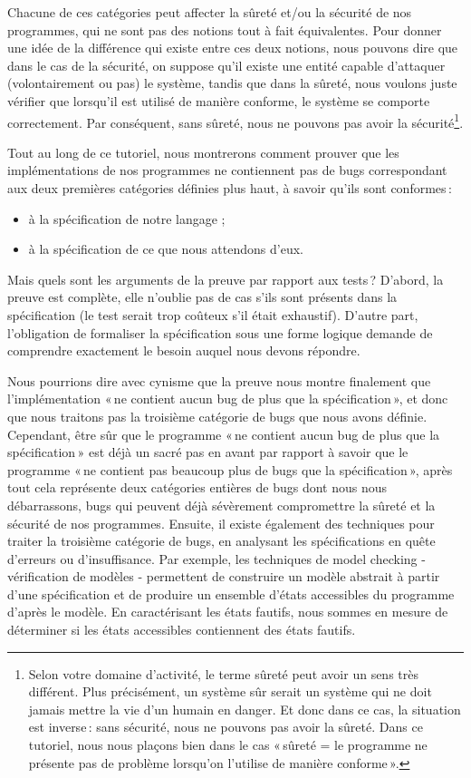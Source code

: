 Chacune de ces catégories peut affecter la sûreté et/ou la sécurité de nos
programmes, qui ne sont pas des notions tout à fait équivalentes. Pour donner
une idée de la différence qui existe entre ces deux notions, nous pouvons
dire que dans le cas de la sécurité, on suppose qu’il existe une entité
capable d’attaquer (volontairement ou pas) le système, tandis que dans la
sûreté, nous voulons juste vérifier que lorsqu’il est utilisé de manière
conforme, le système se comporte correctement. Par conséquent, sans sûreté,
nous ne pouvons pas avoir la sécurité\footnote{Selon votre domaine
d’activité, le terme sûreté peut avoir un sens très différent. Plus
précisément, un système sûr serait un système qui ne doit jamais mettre la
vie d’un humain en danger. Et donc dans ce cas, la situation est inverse :
sans sécurité, nous ne pouvons pas avoir la sûreté. Dans ce tutoriel, nous
nous plaçons bien dans le cas « sûreté = le programme ne présente pas de
problème lorsqu’on l’utilise de manière conforme ».}.


Tout au long de ce tutoriel, nous montrerons comment prouver que les
implémentations de nos programmes ne contiennent pas de bugs correspondant
aux deux premières catégories définies plus haut, à savoir qu’ils sont
conformes :


\begin{itemize}
\item à la spécification de notre langage ;
\item à la spécification de ce que nous attendons d’eux.
\end{itemize}


Mais quels sont les arguments de la preuve par rapport aux tests ? D’abord,
la preuve est complète, elle n’oublie pas de cas s’ils sont présents dans la
spécification (le test serait trop coûteux s’il était exhaustif). D’autre
part, l’obligation de formaliser la spécification sous une forme logique
demande de comprendre exactement le besoin auquel nous devons répondre.

Nous pourrions dire avec cynisme que la preuve nous montre finalement que
l’implémentation « ne contient aucun bug de plus que la spécification », et
donc que nous traitons pas la troisième catégorie de bugs que nous avons
définie. Cependant, être sûr que le programme « ne contient aucun bug de
plus que la spécification » est déjà un sacré pas en avant par rapport à
savoir que le programme « ne contient pas beaucoup plus de bugs que la
spécification », après tout cela représente deux catégories entières de bugs
dont nous nous débarrassons, bugs qui peuvent déjà sévèrement compromettre la
sûreté et la sécurité de nos programmes. Ensuite, il existe également des
techniques pour traiter la troisième catégorie de bugs, en analysant les
spécifications en quête d’erreurs ou d’insuffisance. Par exemple, les
techniques de model checking - vérification de modèles - permettent de
construire un modèle abstrait à partir d’une spécification et de produire
un ensemble d’états accessibles du programme d’après le modèle. En
caractérisant les états fautifs, nous sommes en mesure de déterminer si les
états accessibles contiennent des états fautifs.


